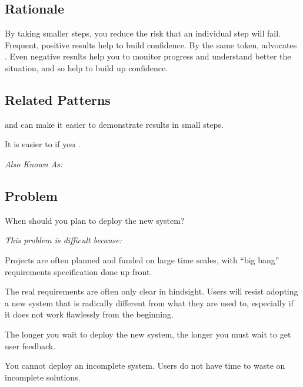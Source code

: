 \documentclass[a4paper,10pt,twoside]{book}
\begin{document}
\subsection*{Rationale}

By taking smaller steps, you reduce the risk that an individual step will fail. Frequent, positive results help to build confidence. By the same token,  advocates  \cite{Beck00a}. Even negative results help you to monitor progress and understand better the situation, and so help to build up confidence.

\subsection*{Related Patterns}

 and  can make it easier to demonstrate results in small steps. 

It is easier to  if you . 


\emph{Also Known As:}   \cite{Brod95a}


\subsection*{Problem}

When should you plan to deploy the new system?

\emph{This problem is difficult because:} 

\begin{bulletlist}
\item Projects are often planned and funded on large time scales, with ``big bang'' requirements specification done up front.

\item The real requirements are often only clear in hindsight. Users will resist adopting a new system that is radically different from what they are used to, especially if it does not work flawlessly from the beginning.

\item The longer you wait to deploy the new system, the longer you must wait to get user feedback.

\item You cannot deploy an incomplete system. Users do not have time to waste on incomplete solutions.
\end{bulletlist}
\end{document}
